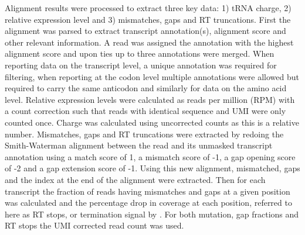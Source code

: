 \documentclass[9pt,lineno]{elife}
\begin{document}
Alignment results were processed to extract three key data: 1) tRNA charge, 2) relative expression level and 3) mismatches, gaps and RT truncations.
First the alignment was parsed to extract transcript annotation(s), alignment score and other relevant information.
A read was assigned the annotation with the highest alignment score and upon ties up to three annotations were merged.
When reporting data on the transcript level, a unique annotation was required for filtering, when reporting at the codon level multiple annotations were allowed but required to carry the same anticodon and similarly for data on the amino acid level.
Relative expression levels were calculated as reads per million (RPM) with a count correction such that reads with identical sequence and UMI were only counted once.
Charge was calculated using uncorrected counts as this is a relative number.
Mismatches, gaps and RT truncations were extracted by redoing the Smith-Waterman alignment between the read and its unmasked transcript annotation using a match score of 1, a mismatch score of -1, a gap opening score of -2 and a gap extension score of -1.
Using this new alignment, mismatched, gaps and the index at the end of the alignment were extracted.
Then for each transcript the fraction of reads having mismatches and gaps at a given position was calculated and the percentage drop in coverage at each position, referred to here as RT stops, or termination signal by \cite{Wang2021-fc}.
For both mutation, gap fractions and RT stops the UMI corrected read count was used.
\end{document}
